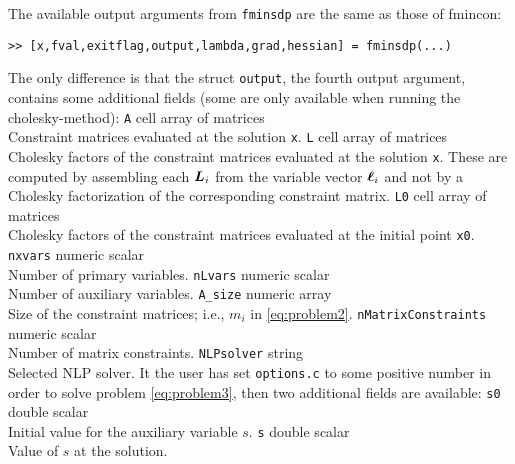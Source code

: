 \documentclass{article}
\newcommand{\bm}[1]{\mbox{\boldmath $#1$}}
\begin{document}
The available output arguments from \texttt{fminsdp} are the same as those of fmincon:
\begin{verbatim}
>> [x,fval,exitflag,output,lambda,grad,hessian] = fminsdp(...)
\end{verbatim}
The only difference is that the struct \texttt{output}, the fourth output argument, contains
some additional fields (some are only available when running the cholesky-method):
\vskip 3mm
\noindent
\texttt{A} \hskip 4.2cm        cell array of matrices  \\
Constraint matrices evaluated at the solution \texttt{x}. 
\vskip 2mm
\noindent
\texttt{L} \hskip 4.2cm        cell array of matrices  \\
Cholesky factors of the constraint matrices evaluated at the solution \texttt{x}. These are computed
by assembling each $\bm{L}_{i}$ from the variable vector $\bm{\ell}_{i}$ and not by a Cholesky factorization
of the corresponding constraint matrix.
\vskip 2mm
\noindent
\texttt{L0} \hskip 4.0cm        cell array of matrices  \\
Cholesky factors of the constraint matrices evaluated at the initial point \texttt{x0}.
\vskip 2mm
\noindent \texttt{nxvars}		\hskip 3.2cm 		numeric scalar \\
Number of primary variables.
\vskip 2mm
\noindent \texttt{nLvars}		\hskip 3.2cm     numeric scalar \\
Number of auxiliary variables.
\vskip 2mm
\noindent \texttt{A\_size}   \hskip 3.3cm     numeric array \\
Size of the constraint matrices; i.e., $m_{i}$ in \eqref{eq:problem2}.
\vskip 2mm
\noindent \texttt{nMatrixConstraints}   \hskip 1cm     numeric scalar \\
Number of matrix constraints.
\vskip 2mm
\noindent \texttt{NLPsolver}   \hskip 2.7cm     string \\
Selected NLP solver.
\vskip 3mm
It the user has set \texttt{options.c} to some positive number in order to solve problem \eqref{eq:problem3},
then two additional fields are available:
\vskip 3mm
\noindent \texttt{s0}   \hskip 2.7cm     double scalar \\
Initial value for the auxiliary variable $s$.
\vskip 2mm
\noindent \texttt{s}   \hskip 2.9cm     double scalar \\
Value of $s$ at the solution.


\end{document}
